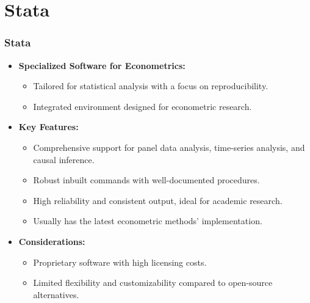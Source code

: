 \documentclass[10pt]{beamer}
\begin{document}
\section{Stata}

\begin{frame}
    \frametitle{Stata}
    \begin{itemize}
        \item \textbf{Specialized Software for Econometrics:}
            \begin{itemize}
                \item Tailored for statistical analysis with a focus on reproducibility.
                \item Integrated environment designed for econometric research.
            \end{itemize}
        \item \textbf{Key Features:}
            \begin{itemize}
                \item Comprehensive support for panel data analysis, time-series analysis, and causal inference.
                \item Robust inbuilt commands with well-documented procedures.
                \item High reliability and consistent output, ideal for academic research.
                \item Usually has the latest econometric methods' implementation.
            \end{itemize}
        \item \textbf{Considerations:}
            \begin{itemize}
                \item Proprietary software with high licensing costs.
                \item Limited flexibility and customizability compared to open-source alternatives.
            \end{itemize}
    \end{itemize}
\end{frame}
\end{document}
